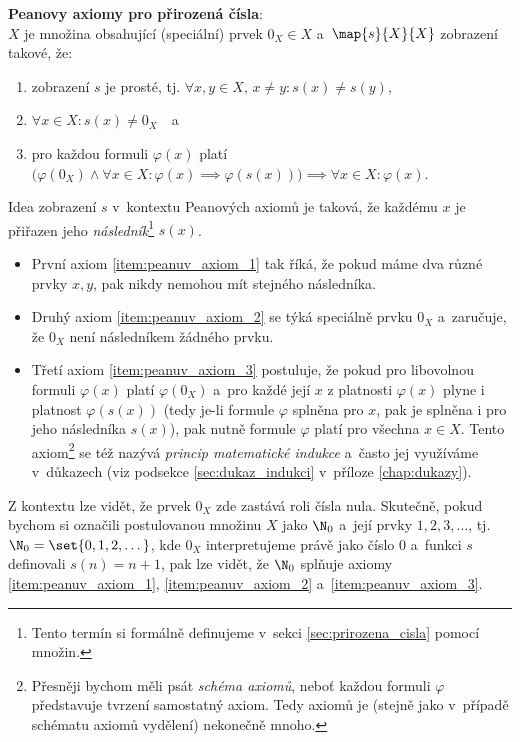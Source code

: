 \noindent\textbf{Peanovy axiomy pro přirozená čísla}:\\
$X$ je množina obsahující (speciální) prvek $0_X\in X$ a~$\map{s}{X}{X}$ zobrazení takové, že:
\begin{enumerate}[label=({P}\arabic*)]
    \item\label{item:peanuv_axiom_1} zobrazení $s$ je prosté, tj. $\forall x,y\in X,\,x\neq y: s(x)\neq s(y)$,
    \item\label{item:peanuv_axiom_2} $\forall x\in X: s(x)\neq 0_X\quad$a
    \item\label{item:peanuv_axiom_3} pro každou formuli $\varphi(x)$ platí $\bigl(\varphi(0_X) \land \forall x\in X: \varphi(x) \implies \varphi(s(x))\bigr) \implies \forall x\in X: \varphi(x)$.
\end{enumerate}
Idea zobrazení $s$ v~kontextu Peanových axiomů je taková, že každému $x$ je přiřazen jeho \emph{následník}\footnote{Tento termín si formálně definujeme v~sekci \ref{sec:prirozena_cisla} pomocí množin.} $s(x)$.
\begin{itemize}
    \item První axiom \ref{item:peanuv_axiom_1} tak říká, že pokud máme dva různé prvky $x,y$, pak nikdy nemohou mít stejného následníka.
    \item Druhý axiom \ref{item:peanuv_axiom_2} se týká speciálně prvku $0_X$ a~zaručuje, že $0_X$ není následníkem žádného prvku.
    \item Třetí axiom \ref{item:peanuv_axiom_3} postuluje, že pokud pro libovolnou formuli $\varphi(x)$ platí $\varphi(0_X)$ a~pro každé její $x$ z platnosti $\varphi(x)$ plyne i platnost $\varphi(s(x))$ (tedy je-li formule $\varphi$ splněna pro $x$, pak je splněna i pro jeho následníka $s(x)$), pak nutně formule $\varphi$ platí pro všechna $x\in X$. Tento axiom\footnote{Přesněji bychom měli psát \emph{schéma axiomů}, neboť každou formuli $\varphi$ představuje tvrzení samostatný axiom. Tedy axiomů je (stejně jako v~případě schématu axiomů vydělení) nekonečně mnoho.} se též nazývá \emph{princip matematické indukce} a~často jej využíváme v~důkazech (viz podsekce \ref{sec:dukaz_indukci} v~příloze \ref{chap:dukazy}).
\end{itemize}
Z kontextu lze vidět, že prvek $0_X$ zde zastává roli čísla nula. Skutečně, pokud bychom si označili postulovanou množinu $X$ jako $\N_0$ a~její prvky $1,2,3,\dots$, tj. $\N_0=\set{0,1,2,\dots}$, kde $0_X$ interpretujeme právě jako číslo $0$ a~funkci $s$ definovali $s(n)=n+1$, pak lze vidět, že $\N_0$ splňuje axiomy \ref{item:peanuv_axiom_1}, \ref{item:peanuv_axiom_2} a~\ref{item:peanuv_axiom_3}.\par
